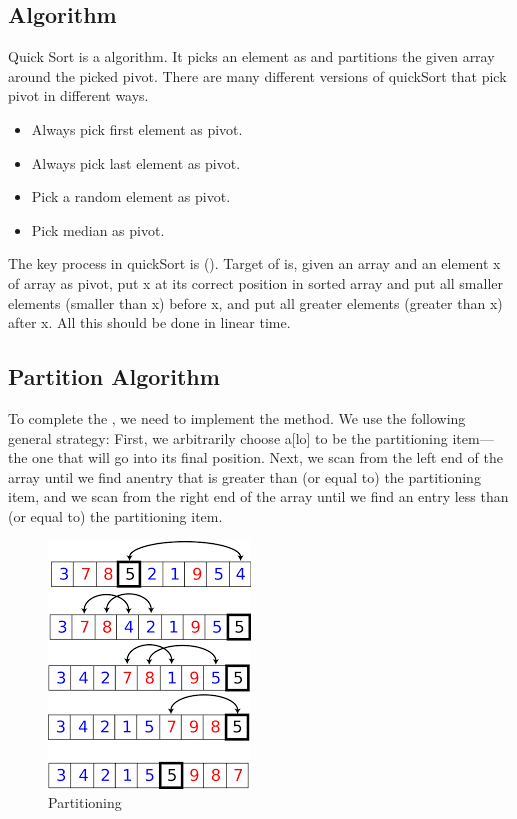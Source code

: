 \documentclass[12pt]{article}
\begin{document}
\subsection{Algorithm}
\par Quick Sort is a  algorithm. It picks an element as  and partitions the given array around the picked pivot. There are many different versions of quickSort that pick pivot in different ways.
\begin{itemize}
\item Always pick first element as pivot.
\item Always pick last element as pivot.
\item Pick a random element as pivot.
\item Pick median as pivot.
\end{itemize}
\par The key process in quickSort is (). Target of  is, given an array and an element x of array as pivot, put x at its correct position in sorted array and put all smaller elements (smaller than x) before x, and put all greater elements (greater than x) after x. All this should be done in linear time\cite{Mcgraw}.
\subsection{Partition Algorithm}
\par To complete the , we need to implement the  method. We use the following general strategy: First, we arbitrarily choose a[lo] to be the partitioning item—the one that will go into its final position. Next, we scan from the left end of the array until we find anentry that is greater than (or equal to) the partitioning item, and we scan from the right end of the array until we find an entry less than (or equal to) the partitioning item.\cite{Knuth}
\begin{figure}[h]
        \begin{center}
                \includegraphics[scale=0.7]{index}
        \end{center}
        \caption{Partitioning}
        \label{fig:shapes}
\end{figure}
 
\end{document}
